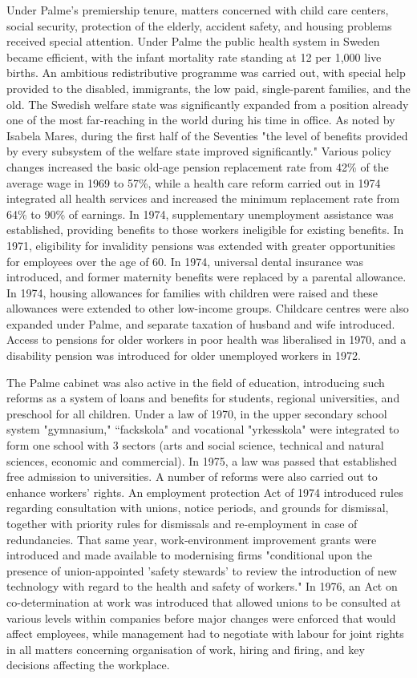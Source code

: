 Under Palme's premiership tenure, matters concerned with child care
centers, social security, protection of the elderly, accident safety,
and housing problems received special attention. Under Palme the public
health system in Sweden became efficient, with the infant mortality rate
standing at 12 per 1,000 live births. An ambitious redistributive
programme was carried out, with special help provided to the disabled,
immigrants, the low paid, single-parent families, and the old. The
Swedish welfare state was significantly expanded from a position already
one of the most far-reaching in the world during his time in office. As
noted by Isabela Mares, during the first half of the Seventies "the
level of benefits provided by every subsystem of the welfare state
improved significantly." Various policy changes increased the basic
old-age pension replacement rate from 42\% of the average wage in 1969
to 57\%, while a health care reform carried out in 1974 integrated all
health services and increased the minimum replacement rate from 64\% to
90\% of earnings. In 1974, supplementary unemployment assistance was
established, providing benefits to those workers ineligible for existing
benefits. In 1971, eligibility for invalidity pensions was extended with
greater opportunities for employees over the age of 60. In 1974,
universal dental insurance was introduced, and former maternity benefits
were replaced by a parental allowance. In 1974, housing allowances for
families with children were raised and these allowances were extended to
other low-income groups. Childcare centres were also expanded under
Palme, and separate taxation of husband and wife introduced. Access to
pensions for older workers in poor health was liberalised in 1970, and a
disability pension was introduced for older unemployed workers in 1972.

The Palme cabinet was also active in the field of education, introducing
such reforms as a system of loans and benefits for students, regional
universities, and preschool for all children. Under a law of 1970, in
the upper secondary school system "gymnasium," ``fackskola" and
vocational "yrkesskola" were integrated to form one school with 3
sectors (arts and social science, technical and natural sciences,
economic and commercial). In 1975, a law was passed that established
free admission to universities. A number of reforms were also carried
out to enhance workers' rights. An employment protection Act of 1974
introduced rules regarding consultation with unions, notice periods, and
grounds for dismissal, together with priority rules for dismissals and
re-employment in case of redundancies. That same year, work-environment
improvement grants were introduced and made available to modernising
firms "conditional upon the presence of union-appointed 'safety
stewards' to review the introduction of new technology with regard to
the health and safety of workers." In 1976, an Act on co-determination
at work was introduced that allowed unions to be consulted at various
levels within companies before major changes were enforced that would
affect employees, while management had to negotiate with labour for
joint rights in all matters concerning organisation of work, hiring and
firing, and key decisions affecting the workplace.

